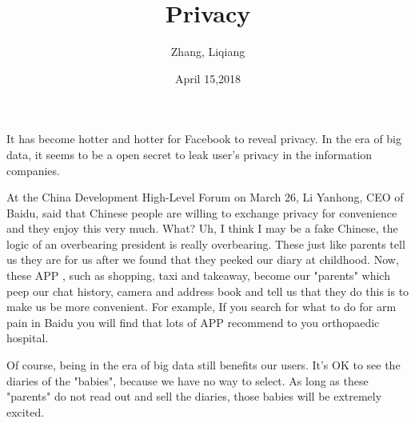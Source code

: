 \documentclass{article}
\author{Zhang, Liqiang}
\date{April 15,2018}
\title{Privacy}
\begin{document}
\maketitle

It has become hotter and hotter for Facebook to reveal privacy. In the era of big data, it seems to be a open secret to leak user's privacy in the information companies. 

At the China Development High-Level Forum on March 26, Li Yanhong, CEO of Baidu, said that Chinese people are willing to exchange privacy for convenience and they enjoy this very much. What? Uh, I think I may be a fake Chinese, the logic of an overbearing president is really overbearing. These just like parents tell us they are for us after we found that they peeked our diary at childhood. Now, these APP , such as shopping, taxi and takeaway, become our "parents" which peep our chat history, camera and address book and tell us that they do this is to make us be more convenient. For example, If you search for what to do for arm pain in Baidu you will find that lots of APP recommend to you orthopaedic hospital.

Of course, being in the era of big data still benefits our users. It's OK to see the diaries of the "babies", because we have no way to select. As long as these "parents" do not read out and sell the diaries, those babies will be extremely excited.
\end{document}

